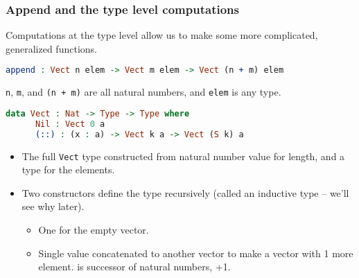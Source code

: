 \documentclass{beamer}
\begin{document}
\begin{frame}[fragile]
  \frametitle{Append and the type level computations}

  Computations at the type level allow us to make some more complicated, generalized functions.

  \pause

  \begin{lstlisting}[language=Idris]
    append : Vect n elem -> Vect m elem -> Vect (n + m) elem
  \end{lstlisting}

  \pause

  \texttt{n}, \texttt{m}, and \texttt{(n + m)} are all natural numbers, and \texttt{elem} is any type.

  \pause

  \begin{lstlisting}[language=Idris]
    data Vect : Nat -> Type -> Type where
      Nil : Vect 0 a
      (::) : (x : a) -> Vect k a -> Vect (S k) a
  \end{lstlisting}

  \begin{itemize}
  \pause
  \item The full \texttt{Vect} type constructed from natural number value for length, and a type for the elements.
  \pause
  \item Two constructors define the type recursively (called an inductive type -- we'll see why later).
    \begin{itemize}
    \item One for the empty vector.
    \item Single value concatenated to another vector to make a vector with 1 more element.  is successor of natural numbers, +1.
    \end{itemize}
  \end{itemize}
\end{frame}
\end{document}
